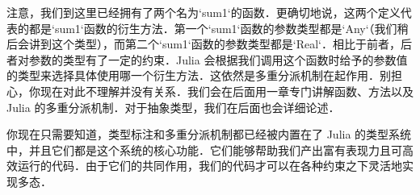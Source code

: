 注意，我们到这里已经拥有了两个名为`sum1`的函数．更确切地说，这两个定义代表的都是`sum1`函数的衍生方法．第一个`sum1`函数的参数类型都是`Any`（我们稍后会讲到这个类型），而第二个`sum1`函数的参数类型都是`Real`．相比于前者，后者对参数的类型有了一定的约束．Julia 会根据我们调用这个函数时给予的参数值的类型来选择具体使用哪一个衍生方法．这依然是多重分派机制在起作用．别担心，你现在对此不理解并没有关系．我们会在后面用一章专门讲解函数、方法以及 Julia 的多重分派机制．对于抽象类型，我们在后面也会详细论述．

你现在只需要知道，类型标注和多重分派机制都已经被内置在了 Julia 的类型系统中，并且它们都是这个系统的核心功能．它们能够帮助我们产出富有表现力且可高效运行的代码．由于它们的共同作用，我们的代码才可以在各种约束之下灵活地实现多态．
